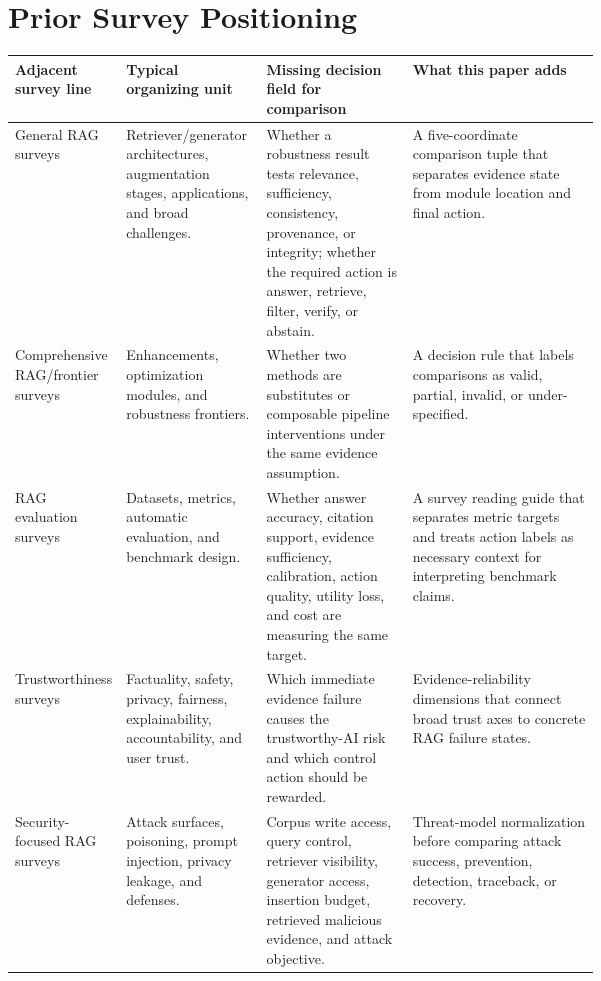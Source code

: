 \documentclass[11pt]{article}
\begin{document}
\section{Prior Survey Positioning}
\begin{table}[t]
\centering
\scriptsize
\renewcommand{\arraystretch}{0.9}
\begin{tabularx}{\linewidth}{>{\raggedright\arraybackslash}p{0.19\linewidth}>{\raggedright\arraybackslash}p{0.24\linewidth}>{\raggedright\arraybackslash}p{0.25\linewidth}X}
\toprule
\textbf{Adjacent survey line} & \textbf{Typical organizing unit} & \textbf{Missing decision field for comparison} & \textbf{What this paper adds} \\
\midrule
General RAG surveys \citep{ragSurvey2024} & Retriever/generator architectures, augmentation stages, applications, and broad challenges. & Whether a robustness result tests relevance, sufficiency, consistency, provenance, or integrity; whether the required action is answer, retrieve, filter, verify, or abstain. & A five-coordinate comparison tuple that separates evidence state from module location and final action. \\
Comprehensive RAG/frontier surveys \citep{ragComprehensive2025} & Enhancements, optimization modules, and robustness frontiers. & Whether two methods are substitutes or composable pipeline interventions under the same evidence assumption. & A decision rule that labels comparisons as valid, partial, invalid, or under-specified. \\
RAG evaluation surveys \citep{ragEvaluationSurvey2024} & Datasets, metrics, automatic evaluation, and benchmark design. & Whether answer accuracy, citation support, evidence sufficiency, calibration, action quality, utility loss, and cost are measuring the same target. & A survey reading guide that separates metric targets and treats action labels as necessary context for interpreting benchmark claims. \\
Trustworthiness surveys \citep{trustRAGCompass2024,trustworthyRAGSurvey2025} & Factuality, safety, privacy, fairness, explainability, accountability, and user trust. & Which immediate evidence failure causes the trustworthy-AI risk and which control action should be rewarded. & Evidence-reliability dimensions that connect broad trust axes to concrete RAG failure states. \\
Security-focused RAG surveys \citep{securityRAGSurvey2026} & Attack surfaces, poisoning, prompt injection, privacy leakage, and defenses. & Corpus write access, query control, retriever visibility, generator access, insertion budget, retrieved malicious evidence, and attack objective. & Threat-model normalization before comparing attack success, prevention, detection, traceback, or recovery. \\

\end{tabularx}
\end{table}
\end{document}

